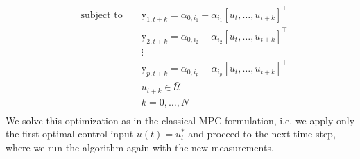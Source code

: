 {\begin{equation}
\begin{aligned}
& \text{subject to }                                    & &  \mathrm{y}_{1,t+k}  =  \alpha_{0,i_1} + \alpha_{i_1}[u_t,\ldots,u_{t+k}]^\top                            \\
&                                                       & &  \mathrm{y}_{2,t+k}  =  \alpha_{0,i_2} + \alpha_{i_2}[u_t,\ldots,u_{t+k}]^\top                            \\
&                                                       & &  \vdots                                                                                                   \\
&                                                       & &  \mathrm{y}_{p,t+k}  =  \alpha_{0,i_p} + \alpha_{i_p}[u_t,\ldots,u_{t+k}]^\top                            \\
&                                                       & &  u_{t+k}            \in \mathcal{\bar U}                                                                  \\
&                                                       & &  k                   =   0,\ldots,N                                                                       \\
\end{aligned}
\end{equation}
We solve this optimization as in the classical MPC formulation, i.e. we apply only the first optimal control input $u(t) = u^*_t$ and proceed to the next time step, where we run the algorithm again with the new measurements.}

